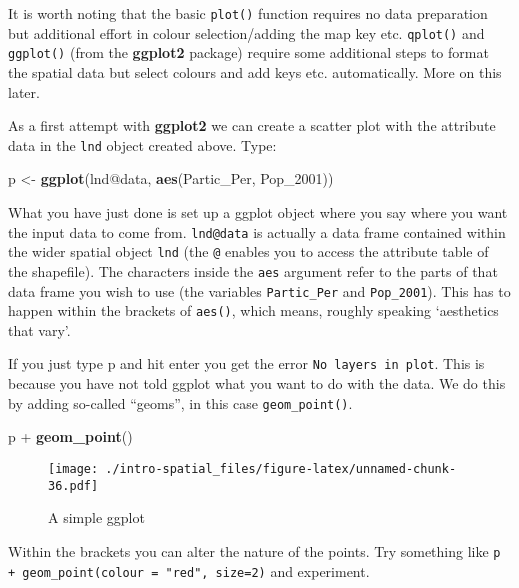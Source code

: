 \documentclass[]{article}
\newenvironment{Shaded}{}{}
\newcommand{\KeywordTok}[1]{\textcolor[rgb]{0.00,0.44,0.13}{\textbf{{#1}}}}
\newcommand{\StringTok}[1]{\textcolor[rgb]{0.25,0.44,0.63}{{#1}}}
\newcommand{\NormalTok}[1]{{#1}}
\begin{document}
It is worth noting that the basic \texttt{plot()} function requires no
data preparation but additional effort in colour selection/adding the
map key etc. \texttt{qplot()} and \texttt{ggplot()} (from the
\textbf{ggplot2} package) require some additional steps to format the
spatial data but select colours and add keys etc. automatically. More on
this later.

As a first attempt with \textbf{ggplot2} we can create a scatter plot
with the attribute data in the \texttt{lnd} object created above. Type:

\begin{Shaded}
\begin{Highlighting}[]
\NormalTok{p <-}\StringTok{ }\KeywordTok{ggplot}\NormalTok{(lnd@data, }\KeywordTok{aes}\NormalTok{(Partic_Per, Pop_2001))}
\end{Highlighting}
\end{Shaded}

What you have just done is set up a ggplot object where you say where
you want the input data to come from. \texttt{lnd@data} is actually a
data frame contained within the wider spatial object \texttt{lnd} (the
\texttt{@} enables you to access the attribute table of the shapefile).
The characters inside the \texttt{aes} argument refer to the parts of
that data frame you wish to use (the variables \texttt{Partic\_Per} and
\texttt{Pop\_2001}). This has to happen within the brackets of
\texttt{aes()}, which means, roughly speaking `aesthetics that vary'.

If you just type p and hit enter you get the error
\texttt{No layers in plot}. This is because you have not told ggplot
what you want to do with the data. We do this by adding so-called
``geoms'', in this case \texttt{geom\_point()}.

\begin{Shaded}
\begin{Highlighting}[]
\NormalTok{p +}\StringTok{ }\KeywordTok{geom_point}\NormalTok{()}
\end{Highlighting}
\end{Shaded}

\begin{figure}[htbp]
\centering
\texttt{[image: ./intro-spatial\_files/figure-latex/unnamed-chunk-36.pdf]}
\caption{A simple ggplot}
\end{figure}

Within the brackets you can alter the nature of the points. Try
something like \texttt{p + geom\_point(colour = "red", size=2)} and
experiment.
\end{document}
